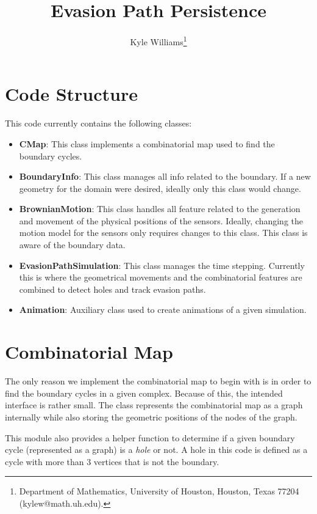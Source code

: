 \documentclass[12pt]{article}
\title{Evasion Path Persistence }
\author{
	Kyle Williams\thanks{Department of Mathematics, University of Houston, Houston, Texas 77204 (kylew@math.uh.edu).}
}
\begin{document}
	
\maketitle

\tableofcontents
\vfill
\clearpage
\let\oldtabular\tabular
\renewcommand{\tabular}[1][1.5]{\def\arraystretch{#1}\oldtabular}
\renewcommand\arraystretch{1.3}

\section{Code Structure}

This code currently contains the following classes:
\begin{itemize}
	\item {\bf CMap}: This class implements a combinatorial map used to find the boundary cycles.
	\item {\bf BoundaryInfo}: This class manages all info related to the boundary. If a new geometry for the domain were desired, ideally only this class would change.
	\item {\bf BrownianMotion}: This class handles all feature related to the generation and movement of the physical positions of the sensors. Ideally, changing the motion model for the sensors only requires changes to this class. This class is aware of the boundary data.
	\item {\bf EvasionPathSimulation}: This class manages the time stepping. Currently this is where the geometrical movements and the combinatorial features are combined to detect holes and track evasion paths.
	\item {\bf Animation}: Auxiliary class used to create animations of a given simulation.
\end{itemize}

\section{Combinatorial Map}
The only reason we implement the combinatorial map to begin with is in order to find the boundary cycles in a given complex. Because of this, the intended interface is rather small. The class represents the combinatorial map as a graph internally while also storing the geometric positions of the nodes of the graph.

 This module also provides a helper function to determine if a given boundary cycle (represented as a graph) is a {\it hole} or not. A hole in this code is defined as a cycle with more than 3 vertices that is not the boundary.
\end{document}
